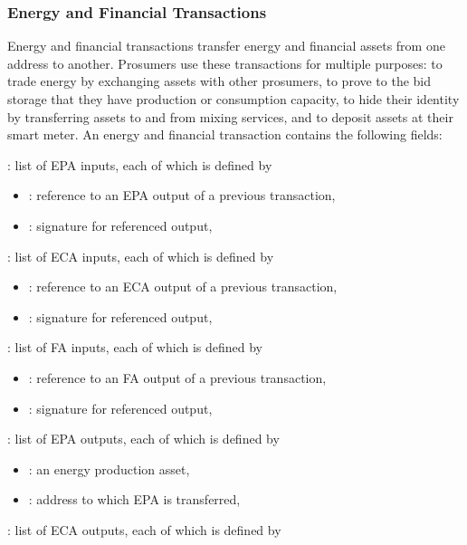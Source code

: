 \subsubsection{Energy and Financial Transactions}

Energy and financial transactions transfer energy and financial assets from one address to another.
Prosumers use these transactions for multiple purposes: to trade energy by exchanging assets with other prosumers, to prove to the bid storage that they have production or consumption capacity, to hide their identity by transferring assets to and from mixing services, and to deposit assets at their smart meter.
%
An energy and financial transaction contains the following fields:
\begin{compactitem}
\item {}: list of EPA inputs, each of which is defined by
\begin{itemize}[leftmargin=0.5em,nosep]
\item {}: reference to an EPA output of a previous transaction,
\item {}: signature for referenced output,
\end{itemize}
\item {}: list of ECA inputs, each of which is defined by
\begin{itemize}[leftmargin=0.5em,nosep]
\item {}: reference to an ECA output of a previous transaction,
\item {}: signature for referenced output,
\end{itemize}
\item {}: list of FA inputs, each of which is defined by
\begin{itemize}[leftmargin=0.5em,nosep]
\item {}: reference to an FA output of a previous transaction,
\item {}: signature for referenced output,
\end{itemize}
\item {}: list of EPA outputs, each of which is defined by
\begin{itemize}[leftmargin=0.5em,nosep]
\item {}: an energy production asset,
\item {}: address to which EPA is transferred,
\end{itemize}
\item {}: list of ECA outputs, each of which is defined by

\end{compactitem}
